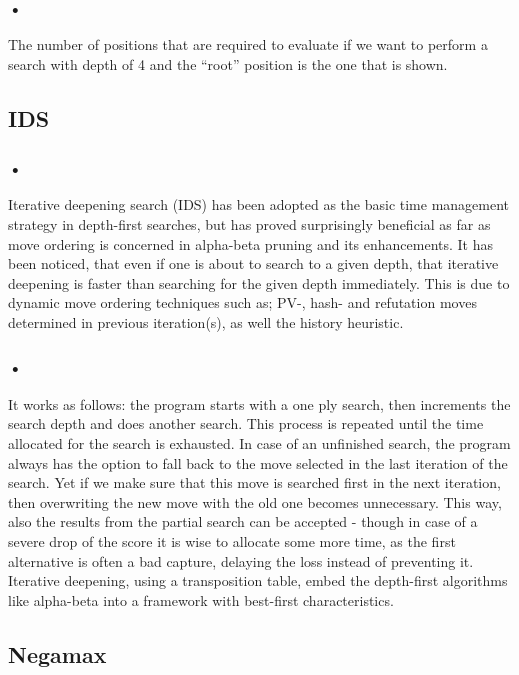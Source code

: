\documentclass{svproc}
\begin{document}
\subsubsection{•}
The number of positions that are required to evaluate if we want to perform a search with depth of 4 and the “root” position is the one that is shown.

\subsection{IDS}

\subsubsection{•}
Iterative deepening search (IDS) has been adopted as the basic time management strategy in depth-first searches, but has proved surprisingly beneficial as far as move ordering is concerned in alpha-beta pruning and its enhancements. It has been noticed, that even if one is about to search to a given depth, that iterative deepening is faster than searching for the given depth immediately. This is due to dynamic move ordering techniques such as; PV-, hash- and refutation moves determined in previous iteration(s), as well the history heuristic.

\subsubsection{•}
It works as follows: the program starts with a one ply search, then increments the search depth and does another search. This process is repeated until the time allocated for the search is exhausted. In case of an unfinished search, the program always has the option to fall back to the move selected in the last iteration of the search. Yet if we make sure that this move is searched first in the next iteration, then overwriting the new move with the old one becomes unnecessary. This way, also the results from the partial search can be accepted - though in case of a severe drop of the score it is wise to allocate some more time, as the first alternative is often a bad capture, delaying the loss instead of preventing it. Iterative deepening, using a transposition table, embed the depth-first algorithms like alpha-beta into a framework with best-first characteristics.

\subsection{Negamax}
\end{document}
